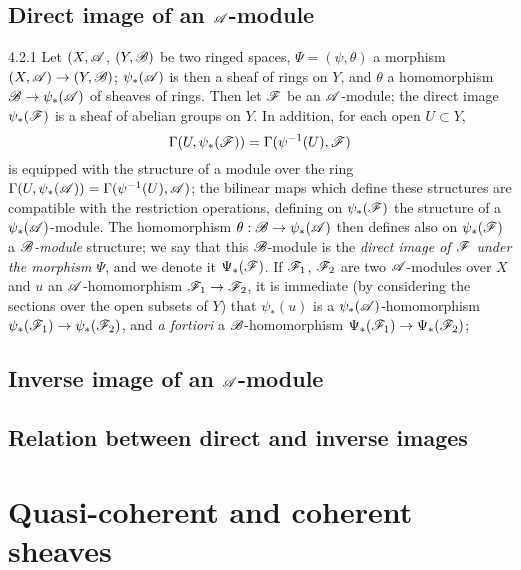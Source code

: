 \documentclass[10pt,oneside]{book}
\begin{document}
\subsection{Direct image of an $\mathscr{A}$-module}
\label{0-prelim-4.2}

\begin{env}{4.2.1}
\label{env-0.4.2.1}
Let $(X,\mathscr{A}$, $(Y,\mathscr{B})$ be two ringed spaces, $\Psi=(\psi,\theta)$ a morphism
$(X,\mathscr{A})\to(Y,\mathscr{B})$; $\psi_*(\mathscr{A})$ is then a sheaf of rings on $Y$, and $\theta$ a
homomorphism $\mathscr{B}\to\psi_*(\mathscr{A})$ of sheaves of rings. Then let $\mathscr{F}$ be an
$\mathscr{A}$-module; the direct image $\psi_*(\mathscr{F})$ is a sheaf of abelian groups on $Y$. In
addition, for each open $U\subset Y$,
\[
  \Gamma(U,\psi_*(\mathscr{F}))=\Gamma(\psi^{-1}(U),\mathscr{F})
\]
is equipped with the structure of a module over the ring
$\Gamma(U,\psi_*(\mathscr{A}))=\Gamma(\psi^{-1}(U),\mathscr{A})$; the bilinear maps which define these
structures are compatible with the restriction operations, defining on $\psi_*(\mathscr{F})$ the
structure of a $\psi_*(\mathscr{A})$-module. The homomorphism $\theta:\mathscr{B}\to\psi_*(\mathscr{A})$
then defines also on $\psi_*(\mathscr{F})$ a \emph{$\mathscr{B}$-module} structure; we say that this
$\mathscr{B}$-module is the \emph{direct image of $\mathscr{F}$ under the morphism $\Psi$}, and we
denote it $\Psi_*(\mathscr{F})$. If $\mathscr{F}_1$, $\mathscr{F}_2$ are two $\mathscr{A}$-modules over $X$ and
$u$ an $\mathscr{A}$-homomorphism $\mathscr{F}_1\to\mathscr{F}_2$, it is immediate (by considering the
sections over the open subsets of $Y$) that $\psi_*(u)$ is a $\psi_*(\mathscr{A})$-homomorphism
$\psi_*(\mathscr{F}_1)\to\psi_*(\mathscr{F}_2)$, and \emph{a fortiori} a $\mathscr{B}$-homomorphism
$\Psi_*(\mathscr{F}_1)\to\Psi_*(\mathscr{F}_2)$;
\end{env}

\subsection{Inverse image of an $\mathscr{A}$-module}
\label{0-prelim-4.3}

\subsection{Relation between direct and inverse images}
\label{0-prelim-4.4}

\section{Quasi-coherent and coherent sheaves}
\label{0-prelim-5}
\end{document}
